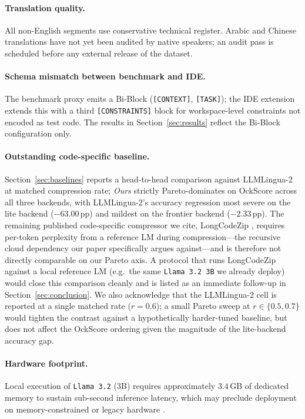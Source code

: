 \documentclass[11pt,a4paper,twocolumn]{article}
\begin{document}
\paragraph{Translation quality.} All non-English segments use conservative technical register. Arabic and Chinese translations have not yet been audited by native speakers; an audit pass is scheduled before any external release of the dataset.

\paragraph{Schema mismatch between benchmark and IDE.} The benchmark proxy emits a Bi-Block (\texttt{[CONTEXT]}, \texttt{[TASK]}); the IDE extension extends this with a third \texttt{[CONSTRAINTS]} block for workspace-level constraints not encoded as test code. The results in Section~\ref{sec:results} reflect the Bi-Block configuration only.

\paragraph{Outstanding code-specific baseline.} Section~\ref{sec:baselines} reports a head-to-head comparison against LLMLingua-2 \cite{pan2024llmlingua2} at matched compression rate; \textit{Ours} strictly Pareto-dominates on OckScore across all three backends, with LLMLingua-2's accuracy regression most severe on the lite backend ($-63.00$\,pp) and mildest on the frontier backend ($-2.33$\,pp). The remaining published code-specific compressor we cite, LongCodeZip \cite{shi2025longcodezip}, requires per-token perplexity from a reference LM during compression---the recursive cloud dependency our paper specifically argues against---and is therefore not directly comparable on our Pareto axis. A protocol that runs LongCodeZip against a local reference LM (e.g.\ the same \texttt{Llama 3.2 3B} we already deploy) would close this comparison cleanly and is listed as an immediate follow-up in Section~\ref{sec:conclusion}. We also acknowledge that the LLMLingua-2 cell is reported at a single matched rate ($r{=}0.6$); a small Pareto sweep at $r \in \{0.5, 0.7\}$ would tighten the contrast against a hypothetically harder-tuned baseline, but does not affect the OckScore ordering given the magnitude of the lite-backend accuracy gap.

\paragraph{Hardware footprint.} Local execution of \texttt{Llama 3.2} (3B) requires approximately $3.4$\,GB of dedicated memory to sustain sub-second inference latency, which may preclude deployment on memory-constrained or legacy hardware \cite{meta2024llama32}.
\end{document}
